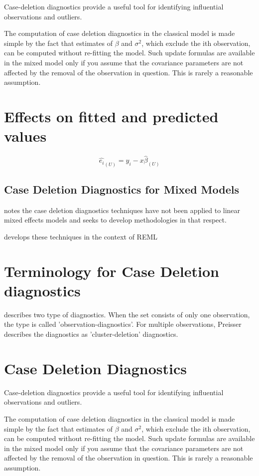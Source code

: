 \documentclass[Main.tex]{subfiles}
\begin{document}
Case-deletion diagnostics provide a useful tool for identifying influential observations and outliers.

The computation of case deletion diagnostics in the classical model is made simple by the fact that estimates of $\beta$ and $\sigma^2$, which exclude the ith observation, can be computed without re-fitting the model. Such update formulas are available in the mixed model only if you assume that the covariance parameters are not affected by the removal of the observation in question. This is rarely a reasonable assumption.

\section{Effects on fitted and predicted values}
\begin{equation}
\hat{e_{i}}_{(U)} = y_{i} - x\hat{\beta}_{(U)}
\end{equation}

\subsection{Case Deletion Diagnostics for Mixed Models}

\citet{Christiansen} notes the case deletion diagnostics techniques have not been applied to linear mixed effects models and seeks to develop methodologies in that respect.

\citet{Christiansen} develops these techniques in the context of REML

\newpage
\section{Terminology for Case Deletion diagnostics} %

\citet{preisser} describes two type of diagnostics. When the set consists of only one observation, the type is called
'observation-diagnostics'. For multiple observations, Preisser describes the diagnostics as 'cluster-deletion' diagnostics.	\section{Case Deletion Diagnostics}
	Case-deletion diagnostics provide a useful tool for identifying influential observations and outliers.
	
	The computation of case deletion diagnostics in the classical model is made simple by the fact that estimates of $\beta$ and $\sigma^2$, which exclude the ith observation, can be computed without re-fitting the model. Such update formulas are available in the mixed model only if you assume that the covariance parameters are not affected by the removal of the observation in question. This is rarely a reasonable assumption.
	
\end{document}
